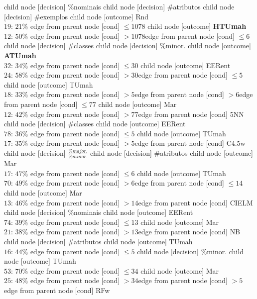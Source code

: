 child {node [decision] {\%nominais}
child {node [decision] {\#atributos}
child {node [decision] {\#exemplos}
child {node [outcome] {Rnd \\$19$: $21\%$} edge from parent node [cond] {$\leq1078$}}
child {node [outcome] {\textbf{HTUmah} \\$12$: $50\%$} edge from parent node [cond] {$>1078$}}edge from parent node [cond] {$\leq6$}}
child {node [decision] {\#classes}
child {node [decision] {\%minor.}
child {node [outcome] {\textbf{ATUmah} \\$32$: $34\%$} edge from parent node [cond] {$\leq30$}}
child {node [outcome] {EERent \\$24$: $58\%$} edge from parent node [cond] {$>30$}}edge from parent node [cond] {$\leq5$}}
child {node [outcome] {TUmah \\$18$: $33\%$} edge from parent node [cond] {$>5$}}edge from parent node [cond] {$>6$}}edge from parent node [cond] {$\leq77$}}
child {node [outcome] {Mar \\$12$: $42\%$} edge from parent node [cond] {$>77$}}edge from parent node [cond] {5NN}}
child {node [decision] {\#classes}
child {node [outcome] {EERent \\$78$: $36\%$} edge from parent node [cond] {$\leq5$}}
child {node [outcome] {TUmah \\$17$: $35\%$} edge from parent node [cond] {$>5$}}edge from parent node [cond] {C4.5w}}
child {node [decision] {$\frac{\%major.}{\%minor.}$}
child {node [decision] {\#atributos}
child {node [outcome] {Mar \\$17$: $47\%$} edge from parent node [cond] {$\leq6$}}
child {node [outcome] {TUmah \\$70$: $49\%$} edge from parent node [cond] {$>6$}}edge from parent node [cond] {$\leq14$}}
child {node [outcome] {Mar \\$13$: $46\%$} edge from parent node [cond] {$>14$}}edge from parent node [cond] {CIELM}}
child {node [decision] {\%nominais}
child {node [outcome] {EERent \\$74$: $39\%$} edge from parent node [cond] {$\leq13$}}
child {node [outcome] {Mar \\$21$: $38\%$} edge from parent node [cond] {$>13$}}edge from parent node [cond] {NB}}
child {node [decision] {\#atributos}
child {node [outcome] {TUmah \\$16$: $44\%$} edge from parent node [cond] {$\leq5$}}
child {node [decision] {\%minor.}
child {node [outcome] {TUmah \\$53$: $70\%$} edge from parent node [cond] {$\leq34$}}
child {node [outcome] {Mar \\$25$: $48\%$} edge from parent node [cond] {$>34$}}edge from parent node [cond] {$>5$}}edge from parent node [cond] {RFw}}

